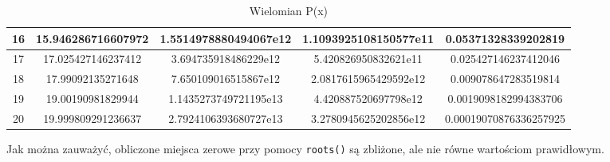 \documentclass[15pt, a4paper]{article}
\begin{document}
\begin{table}[ht]
\begin{adjustbox}{max width=\textwidth}
\begin{tabular}{|c|c|c|c|c|}
        \hline
        16 & 15.946286716607972 & 1.5514978880494067e12 & 1.1093925108150577e11 & 0.05371328339202819 \\
        \hline
        17 & 17.025427146237412 & 3.694735918486229e12 & 5.420826950832621e11 & 0.025427146237412046 \\
        \hline
        18 & 17.99092135271648 & 7.650109016515867e12 & 2.0817615965429592e12 & 0.009078647283519814 \\
        \hline
        19 & 19.00190981829944 & 1.1435273749721195e13 & 4.420887520697798e12 & 0.0019098182994383706 \\
        \hline
        20 & 19.999809291236637 & 2.7924106393680727e13 & 3.2780945625202856e12 & 0.00019070876336257925 \\
        \hline
    \end{tabular}
    \end{adjustbox}
    \label{wielomian}
    \caption{Wielomian P(x)}
\end{table}

\vspace{0.5cm}

\noindent Jak można zauważyć, obliczone miejsca zerowe przy pomocy \verb|roots()| są zbliżone, ale nie równe wartościom prawidłowym.
\end{document}
